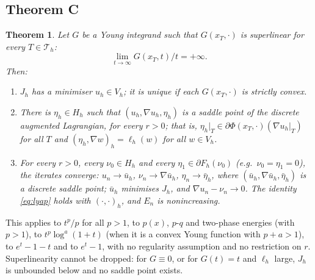 \documentclass[11pt]{amsart}
\newtheorem{maintheorem}{Theorem}
\theoremstyle{definition}
\theoremstyle{remark}
\numberwithin{equation}{section}
\begin{document}
\subsection{Theorem C}
\begin{maintheorem}\label{thm:C}
Let $G$ be a Young integrand such that $G(x_T,\cdot)$ is superlinear for every $T\in\mathcal T_h$:
\begin{equation}\label{eq:superlinear}
\lim_{t\to\infty}G(x_T,t)/t=+\infty .
\end{equation}
Then:
\begin{enumerate}[label=\textup{(\roman*)}]
\item $J_h$ has a minimiser $u_h\in V_h$; it is unique if each $G(x_T,\cdot)$ is strictly convex.
\item There is $\eta_h\in H_h$ such that $(u_h,\nabla u_h,\eta_h)$ is a saddle point of the discrete augmented Lagrangian, for every $r>0$; that is, $\eta_h|_T\in\partial\Phi(x_T,\cdot)(\nabla u_h|_T)$ for all $T$ and $(\eta_h,\nabla w)_h=\ell_h(w)$ for all $w\in V_h$.
\item For every $r>0$, every $\nu_0\in H_h$ and every $\eta_1\in\partial F_h(\nu_0)$ \textup(e.g.\ $\nu_0=\eta_1=0$\textup), the iterates converge: $u_n\to\bar u_h$, $\nu_n\to\nabla\bar u_h$, $\eta_n\to\bar\eta_h$, where $(\bar u_h,\nabla\bar u_h,\bar\eta_h)$ is a discrete saddle point; $\bar u_h$ minimises $J_h$, and $\nabla u_n-\nu_n\to0$. The identity \eqref{eq:lyap} holds with $(\cdot,\cdot)_h$, and $E_n$ is nonincreasing.
\end{enumerate}
\end{maintheorem}

This applies to $t^p/p$ for all $p>1$, to $p(x)$, $p$-$q$ and two-phase energies (with $p>1$), to $t^p\log^a(1+t)$ (when it is a convex Young function with $p+a>1$), to $e^t-1-t$ and to $e^t-1$, with no regularity assumption and no restriction on $r$. Superlinearity cannot be dropped: for $G\equiv0$, or for $G(t)=t$ and $\ell_h$ large, $J_h$ is unbounded below and no saddle point exists.
\end{document}
